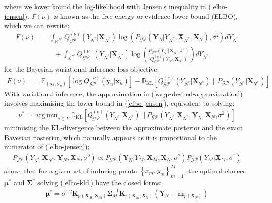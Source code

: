\documentclass{article}
\newcommand{\KLD}{\operatorname{\mathbb{D}_{KL}}}
\newcommand{\GP}{\operatorname{\mathcal{GP}}}
\DeclareMathOperator*{\argmin}{arg\,min}
\numberwithin{equation}{section}
\begin{document}
where we lower bound the log-likelihood with Jensen's inequality in (\ref{elbo-jensen}). $F(\nu)$ is known as the free energy or evidence lower bound (ELBO), which we can rewrite:
\begin{align}
    F(\nu) &= \int_{\mathbb{R}^{N^*}} Q^{(\nu)}_{\GP}(Y_{N^*} \vert \mathbf{X}_{N^*}) \log \left(P_{\GP}\left(\mathbf{Y}_N \vert Y_{N^*},  \mathbf{X}_{N^*}, \mathbf{X}_N\right), \sigma^2\right) d Y_{N^*} \nonumber
    \\ & \qquad + \int_{\mathbb{R}^{N^*}} Q^{(\nu)}_{\GP}(Y_{N^*} \vert \mathbf{X}_{N^*}) \log \left(\frac{P_{\GP}\left( Y_{N^*} \vert \mathbf{X}_{N^*}, \sigma^2\right) }{Q^{(\nu)}_{\GP}(Y_{N^*} \vert \mathbf{X}_{N^*})}\right) d Y_{N^*}
    \label{elbo-broken-down}
\end{align}
for the Bayesian variational inference loss objective:
\begin{align}
    F(\nu) &=\mathbb{E}_{(\mathbf{x}_n, \mathbf{y}_n)}\left[ \log Q^{(\nu)}_{\GP}(\mathbf{y}_n \vert \mathbf{x}_n)\right] - \KLD \left[ Q^{(\nu)}_{\GP}(Y_{N^*} \vert \mathbf{X}_{N^*}) \| P_{\GP}\left( Y_{N^*} \vert \mathbf{X}_{N^*}\right) \right]
    \label{bvi-loss}
\end{align}
With variational inference, the approximation in (\ref{svgp-desired-approximation}) involves maximising the lower bound in (\ref{elbo-jensen}), equivalent to solving:
\begin{align}
    \nu^* = \argmin_{\nu \in \Gamma}\KLD \left[ Q_{\GP}^{(\nu)}\left(Y_{N^*} \vert \mathbf{X}_{N^*}\right) \Big\| P_{\GP}\left(Y_{N^*} \vert \mathbf{X}_{N^*}, \mathbf{Y}_N, \mathbf{X}_N, \sigma^2 \right) \right]
    \label{elbo-kld}
\end{align}
minimising the KL-divergence between the approximate posterior and the exact Bayesian posterior, which naturally appears as it is proportional to the numerator of (\ref{elbo-jensen}):
\begin{align}
    P_{\GP}\left(Y_{N^*} \vert \mathbf{X}_{N^*}, \mathbf{Y}_N, \mathbf{X}_N, \sigma^2 \right) \propto P_{\GP}\left(\mathbf{Y}_N \vert Y_M,  \mathbf{X}_M, \mathbf{X}_N, \sigma^2\right) P_{\GP}\left( Y_M \vert \mathbf{X}_M, \sigma^2\right) 
    \label{bayes-posterior-prop}
\end{align}
\cite{titsias2009variational} shows that for a given set of inducing points $\left\{ x_m, y_m\right\}_{m=1}^M$, the optimal choices $\boldsymbol{\mu}^*$ and $\mathbf{\Sigma}^*$ solving (\ref{elbo-kld}) have the closed forms:
\begin{align}
    \label{svgp-optimal-mean}
    \boldsymbol{\mu}^* = \sigma^{-2}\mathbf{K}_{p(\mathbf{X}_M, \mathbf{X}_M)} \mathbf{\Sigma}_M^{-1}\mathbf{K}_{p(\mathbf{X}_M, \mathbf{X}_N)} \left(\mathbf{Y}_N - \mathbf{m}_{p\left(\mathbf{X}_N\right)}\right)
\end{align}
\end{document}
